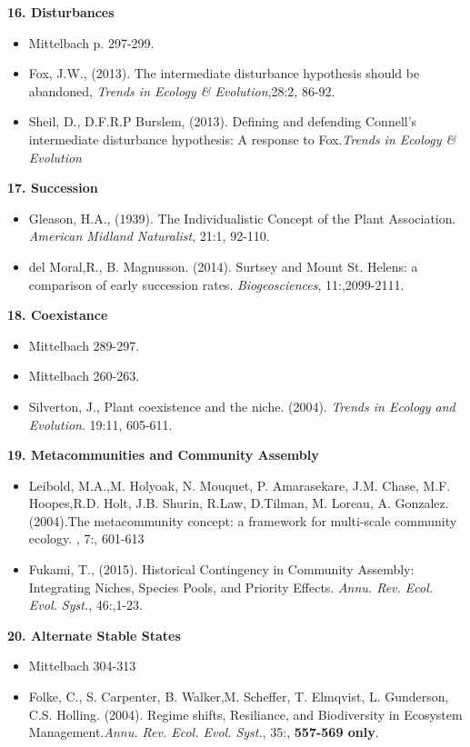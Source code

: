 \documentclass{article}
\begin{document}
\hline
\textbf{16. Disturbances}
\begin{itemize}
\item Mittelbach p. 297-299.
\item Fox, J.W., (2013). The intermediate disturbance hypothesis should be abandoned, \textit{Trends in Ecology & Evolution},28:2, 86-92.
\item Sheil, D., D.F.R.P Burslem, (2013). Defining and defending Connell's intermediate disturbance hypothesis: A response to Fox.\textit{Trends in Ecology & Evolution}
\end{itemize}
\hline
\textbf{17. Succession}
\begin{itemize}
\item Gleason, H.A., (1939). The Individualistic Concept of the Plant Association. \textit{American Midland Naturalist}, 21:1, 92-110.
\item del Moral,R., B. Magnusson. (2014). Surtsey and Mount St. Helens: a comparison of early succession rates. \textit{Biogeosciences}, 11:,2099-2111.
\end{itemize}
\hline
\textbf{18. Coexistance}
\begin{itemize}
\item Mittelbach 289-297.
\item Mittelbach 260-263.
\item Silverton, J., Plant coexistence and the niche. (2004). \textit{Trends in Ecology and Evolution}. 19:11, 605-611.
\end{itemize}
\hline
\textbf{19. Metacommunities and Community Assembly}
\begin{itemize}
\item Leibold, M.A.,M. Holyoak, N. Mouquet, P. Amarasekare, J.M. Chase, M.F. Hoopes,R.D. Holt, J.B. Shurin, R.Law, D.Tilman, M. Loreau, A. Gonzalez. (2004).The metacommunity concept: a framework for multi-scale community ecology. , 7:, 601-613
\item Fukami, T., (2015). Historical Contingency in Community Assembly: Integrating Niches, Species Pools, and Priority Effects. \textit{Annu. Rev. Ecol. Evol. Syst.}, 46:,1-23. 
\end{itemize}
\hline
\textbf{20. Alternate Stable States}
\begin{itemize}
\item Mittelbach 304-313
\item Folke, C., S. Carpenter, B. Walker,M. Scheffer, T. Elmqvist, L. Gunderson, C.S. Holling. (2004). Regime shifts, Resiliance, and Biodiversity in Ecosystem Management.\textit{Annu. Rev. Ecol. Evol. Syst.}, 35:, \textbf{557-569 only}.
\end{itemize}
\end{document}
